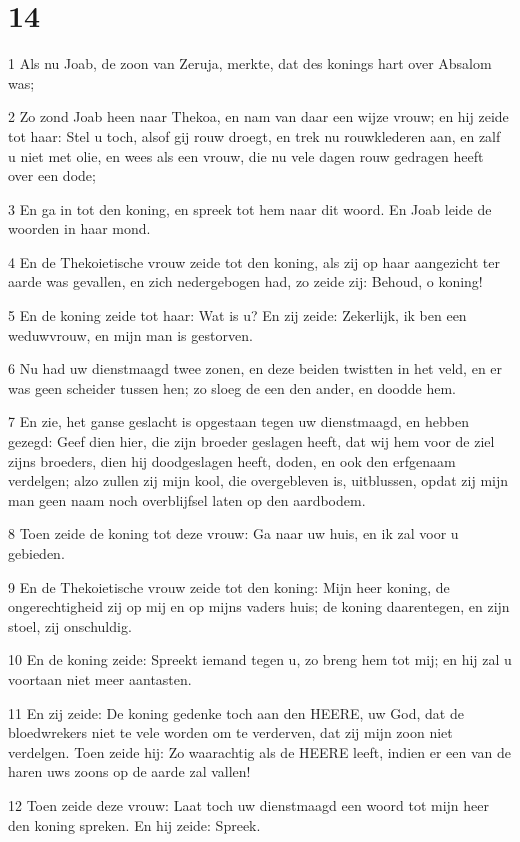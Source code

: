 \chapter{14}

\par 1 Als nu Joab, de zoon van Zeruja, merkte, dat des konings hart over Absalom was;
\par 2 Zo zond Joab heen naar Thekoa, en nam van daar een wijze vrouw; en hij zeide tot haar: Stel u toch, alsof gij rouw droegt, en trek nu rouwklederen aan, en zalf u niet met olie, en wees als een vrouw, die nu vele dagen rouw gedragen heeft over een dode;
\par 3 En ga in tot den koning, en spreek tot hem naar dit woord. En Joab leide de woorden in haar mond.
\par 4 En de Thekoietische vrouw zeide tot den koning, als zij op haar aangezicht ter aarde was gevallen, en zich nedergebogen had, zo zeide zij: Behoud, o koning!
\par 5 En de koning zeide tot haar: Wat is u? En zij zeide: Zekerlijk, ik ben een weduwvrouw, en mijn man is gestorven.
\par 6 Nu had uw dienstmaagd twee zonen, en deze beiden twistten in het veld, en er was geen scheider tussen hen; zo sloeg de een den ander, en doodde hem.
\par 7 En zie, het ganse geslacht is opgestaan tegen uw dienstmaagd, en hebben gezegd: Geef dien hier, die zijn broeder geslagen heeft, dat wij hem voor de ziel zijns broeders, dien hij doodgeslagen heeft, doden, en ook den erfgenaam verdelgen; alzo zullen zij mijn kool, die overgebleven is, uitblussen, opdat zij mijn man geen naam noch overblijfsel laten op den aardbodem.
\par 8 Toen zeide de koning tot deze vrouw: Ga naar uw huis, en ik zal voor u gebieden.
\par 9 En de Thekoietische vrouw zeide tot den koning: Mijn heer koning, de ongerechtigheid zij op mij en op mijns vaders huis; de koning daarentegen, en zijn stoel, zij onschuldig.
\par 10 En de koning zeide: Spreekt iemand tegen u, zo breng hem tot mij; en hij zal u voortaan niet meer aantasten.
\par 11 En zij zeide: De koning gedenke toch aan den HEERE, uw God, dat de bloedwrekers niet te vele worden om te verderven, dat zij mijn zoon niet verdelgen. Toen zeide hij: Zo waarachtig als de HEERE leeft, indien er een van de haren uws zoons op de aarde zal vallen!
\par 12 Toen zeide deze vrouw: Laat toch uw dienstmaagd een woord tot mijn heer den koning spreken. En hij zeide: Spreek.
